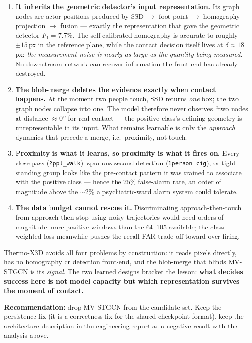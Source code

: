 \documentclass[11pt, a4paper]{article}
\begin{document}
\begin{enumerate}[itemsep=2pt]
    \item \textbf{It inherits the geometric detector's input representation.} Its graph
    nodes are actor positions produced by SSD $\rightarrow$ foot-point $\rightarrow$
    homography projection $\rightarrow$ fusion --- exactly the representation that gave
    the geometric detector $F_1=7.7\%$. The self-calibrated homography is accurate to
    roughly $\pm15$\,px in the reference plane, while the contact decision itself lives
    at $\delta\approx18$\,px: \emph{the measurement noise is nearly as large as the
    quantity being measured.} No downstream network can recover information the
    front-end has already destroyed.
    \item \textbf{The blob-merge deletes the evidence exactly when contact happens.} At
    the moment two people touch, SSD returns \emph{one} box; the two graph nodes
    collapse into one. The model therefore never observes ``two nodes at distance
    $\approx0$'' for real contact --- the positive class's defining geometry is
    unrepresentable in its input. What remains learnable is only the \emph{approach}
    dynamics that precede a merge, i.e.\ proximity, not touch.
    \item \textbf{Proximity is what it learns, so proximity is what it fires on.} Every
    close pass (\texttt{2ppl\_walk}), spurious second detection
    (\texttt{1person\,cig}), or tight standing group looks like the pre-contact pattern
    it was trained to associate with the positive class --- hence the 25\% false-alarm
    rate, an order of magnitude above the $\sim$2\% a psychiatric-ward alarm system
    could tolerate.
    \item \textbf{The data budget cannot rescue it.} Discriminating approach-then-touch
    from approach-then-stop using noisy trajectories would need orders of magnitude more
    positive windows than the 64--105 available; the class-weighted loss meanwhile pushes
    the recall-FAR trade-off toward over-firing.
\end{enumerate}

Thermo-X3D avoids all four problems by construction: it reads pixels directly, has no
homography or detection front-end, and the blob-merge that blinds MV-STGCN is its
\emph{signal}. The two learned designs bracket the lesson: \textbf{what decides success
here is not model capacity but which representation survives the moment of contact.}

\textbf{Recommendation:} drop MV-STGCN from the candidate set. Keep the persistence fix
(it is a correctness fix for the shared checkpoint format), keep the architecture
description in the engineering report as a negative result with the analysis above.
\end{document}
